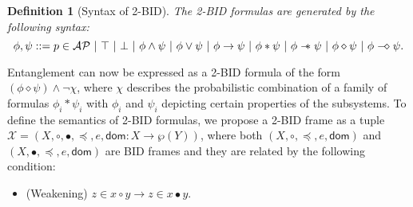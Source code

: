 \documentclass[conference,compsoc, 10pt]{IEEEtran}
\newtheorem{definition}{Definition}[section]
\newcommand {\cD } {{\mathcal{D}}}
\newcommand {\cO } {{\mathcal{O}}}
\newcommand {\cX } {{\mathcal{X}}}
\newcommand {\LTypeEs } {{\mathsf{dom}}}
\newcommand {\var } {\mathsf{var}}
\newcommand {\sepimp} {\mathrel{-\mkern-6mu*}}
\newcommand {\AP} {{\mathcal{AP}}}
\newcommand{\sd}{\diamond}%
\newcommand {\sdimp} {\mathrel{-\mkern-2.5mu\diamond}}
\newcommand{\form}{{\bf Form}}
\begin{document}
\begin{appendices}
		\begin{definition}[Syntax of 2-BID]
			The 2-BID formulas are generated by the following syntax:
			$$
			\phi,\psi ::= p\in\AP\ |\ \top\ |\ \bot\ |\ \phi\wedge\psi\ |\ \phi\vee\psi\ |\ \phi\rightarrow\psi\ |\ \phi\ast\psi\ |\ \phi\sepimp\psi\ |\ \phi \sd \psi\ |\ \phi \sdimp \psi.
			$$
		\end{definition}
		Entanglement can now be expressed as a 2-BID formula of the form $(\phi\sd\psi)\wedge\neg\chi$, where $\chi$ describes the probabilistic combination of a family of formulas $\phi_i\ast\psi_i$ with $\phi_i$ and $\psi_i$ depicting certain properties of the subsystems.  
		To define the semantics of 2-BID formulas, we propose a 2-BID frame as a tuple $\cX = (X,\circ,\bullet,\preceq,e,\LTypeEs: X\rightarrow \wp(Y))$, where both $(X,\circ,\preceq,e,\LTypeEs)$ and $(X,\bullet,\preceq,e,\LTypeEs)$ are BID frames and they are related by the following condition: 
		\begin{itemize}
			\item[] (Weakening) $z\in x\circ y\rightarrow z\in x\bullet y$.
		\end{itemize}
		

\end{appendices}
\end{document}
